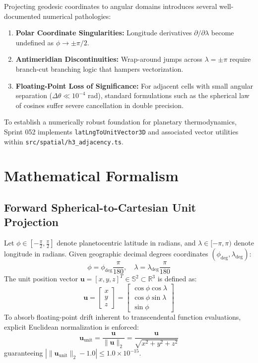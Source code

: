 \documentclass[10pt,journal,compsoc]{IEEEtran}
\begin{document}
Projecting geodesic coordinates to angular domains introduces several well-documented numerical pathologies:
\begin{enumerate}
    \item \textbf{Polar Coordinate Singularities:} Longitude derivatives $\partial / \partial \lambda$ become undefined as $\phi \to \pm \pi/2$.
    \item \textbf{Antimeridian Discontinuities:} Wrap-around jumps across $\lambda = \pm \pi$ require branch-cut branching logic that hampers vectorization.
    \item \textbf{Floating-Point Loss of Significance:} For adjacent cells with small angular separation ($\Delta \theta \ll 10^{-4}$ rad), standard formulations such as the spherical law of cosines suffer severe cancellation in double precision.
\end{enumerate}

To establish a numerically robust foundation for planetary thermodynamics, Sprint 052 implements \texttt{latLngToUnitVector3D} and associated vector utilities within \texttt{src/spatial/h3\_adjacency.ts}.

\section{Mathematical Formalism}

\subsection{Forward Spherical-to-Cartesian Unit Projection}
Let $\phi \in [-\frac{\pi}{2}, \frac{\pi}{2}]$ denote planetocentric latitude in radians, and $\lambda \in [-\pi, \pi)$ denote longitude in radians. Given geographic decimal degrees coordinates $(\phi_{\text{deg}}, \lambda_{\text{deg}})$:
\begin{equation}
\phi = \phi_{\text{deg}} \frac{\pi}{180}, \quad \lambda = \lambda_{\text{deg}} \frac{\pi}{180}
\end{equation}
The unit position vector $\mathbf{u} = [x, y, z]^T \in \mathbb{S}^2 \subset \mathbb{R}^3$ is defined as:
\begin{equation}
\mathbf{u} = \begin{bmatrix} x \\ y \\ z \end{bmatrix} = \begin{bmatrix} \cos\phi \cos\lambda \\ \cos\phi \sin\lambda \\ \sin\phi \end{bmatrix}
\end{equation}
To absorb floating-point drift inherent to transcendental function evaluations, explicit Euclidean normalization is enforced:
\begin{equation}
\mathbf{u}_{\text{unit}} = \frac{\mathbf{u}}{\|\mathbf{u}\|_2} = \frac{\mathbf{u}}{\sqrt{x^2 + y^2 + z^2}}
\end{equation}
guaranteeing $|\|\mathbf{u}_{\text{unit}}\|_2 - 1.0| \le 1.0 \times 10^{-15}$.
\end{document}
